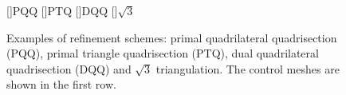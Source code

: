 \begin{figure}[tb]
  \centering
  []{\scriptsize PQQ} 
  []{\scriptsize PTQ}
  []{\scriptsize DQQ} 
  []{\scriptsize $\sqrt{3}$} 
  \caption{Examples of refinement schemes: 
    primal quadrilateral quadrisection (PQQ),
    primal triangle quadrisection (PTQ),
    dual quadrilateral quadrisection (DQQ) and
    $\sqrt{3}$ triangulation. The control meshes are shown
    in the first row.}
  \label{fig:RefSchemes}
\end{figure}


 





